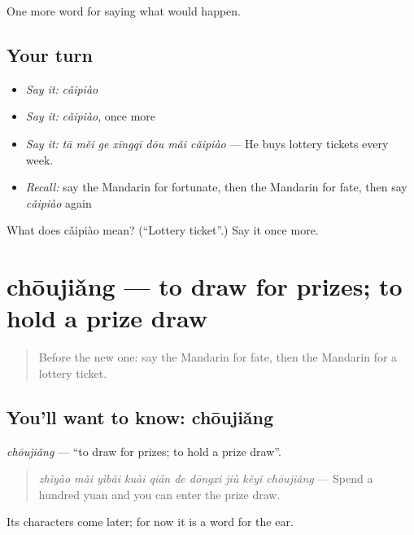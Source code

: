 \begin{grammarlens}[title={What you've built}]
One more word for saying what would happen.
\end{grammarlens}

\subsection*{Your turn}
\begin{itemize}
\raggedright
  \item \emph{Say it:} \emph{cǎipiào}
  \item \emph{Say it:} \emph{cǎipiào}, once more
  \item \emph{Say it:} \emph{tā měi ge xīngqī dōu mǎi cǎipiào} — He buys lottery tickets every week.
  \item \emph{Recall:} say the Mandarin for fortunate, then the Mandarin for fate, then say \emph{cǎipiào} again
\end{itemize}

\begin{tcolorbox}[breakable,colback=teal!4,colframe=teal!35!black,title={Before you move on}]
What does cǎipiào mean? (\textquotedblleft{}Lottery ticket\textquotedblright{}.) Say it once more.
\end{tcolorbox}
\section[chōujiǎng]{chōujiǎng — to draw for prizes; to hold a prize draw}

\label{lesson:ZH-C530-choujiang}



\begin{quote}
Before the new one: say the Mandarin for fate, then the Mandarin for a lottery ticket.
\end{quote}

\subsection*{You'll want to know: chōujiǎng}
\emph{chōujiǎng} — \textquotedblleft{}to draw for prizes; to hold a prize draw\textquotedblright{}.

\begin{quote}
\emph{zhǐyào mǎi yìbǎi kuài qián de dōngxi jiù kěyǐ chōujiǎng} — Spend a hundred yuan and you can enter the prize draw.
\end{quote}

Its characters come later; for now it is a word for the ear.


